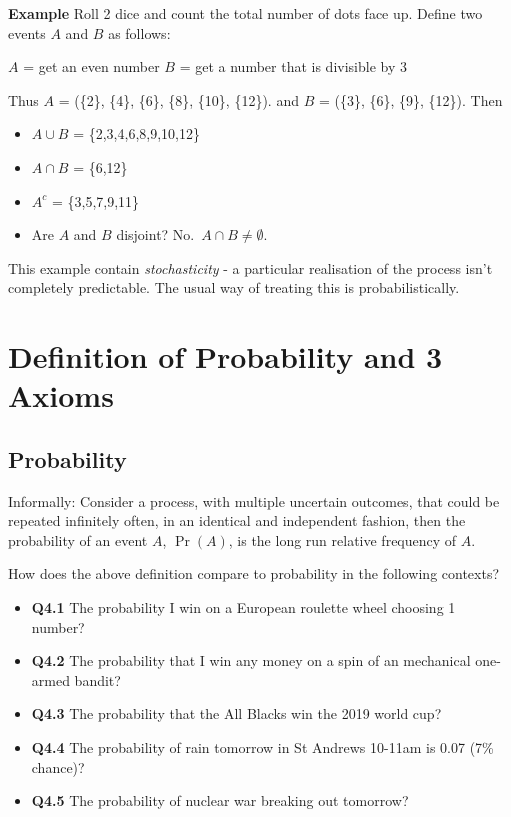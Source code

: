 \documentclass[
  oneside]{krantz}
\providecommand{\tightlist}{%
  \setlength{\itemsep}{0pt}\setlength{\parskip}{0pt}}
\begin{document}
\textbf{Example} Roll 2 dice and count the total number of dots face up. Define two events \(A\) and \(B\) as follows:

\(A\) = get an even number
\(B\) = get a number that is divisible by 3

Thus \(A\) = (\{2\}, \{4\}, \{6\}, \{8\}, \{10\}, \{12\}). and \(B\) = (\{3\}, \{6\}, \{9\}, \{12\}). Then

\begin{itemize}
\tightlist
\item
  \(A \cup B\) = \{2,3,4,6,8,9,10,12\}
\item
  \(A \cap B\) = \{6,12\}
\item
  \(A^c\) = \{3,5,7,9,11\}
\item
  Are \(A\) and \(B\) disjoint? No.~\(A \cap B \ne \emptyset\).
\end{itemize}

This example contain \emph{stochasticity} - a particular realisation of the process isn't completely predictable. The usual way of treating this is probabilistically.

\hypertarget{definition-of-probability-and-3-axioms}{%
\section{Definition of Probability and 3 Axioms}\label{definition-of-probability-and-3-axioms}}

\hypertarget{probability-1}{%
\subsection{Probability}\label{probability-1}}

Informally: Consider a process, with multiple uncertain outcomes, that could be repeated infinitely often, in an identical and independent fashion, then the probability of an event \(A\), \(\Pr(A)\), is the long run relative frequency of \(A\).

How does the above definition compare to probability in the following contexts?

\begin{itemize}
\tightlist
\item
  \textbf{Q4.1} The probability I win on a European roulette wheel choosing 1 number?
\item
  \textbf{Q4.2} The probability that I win any money on a spin of an mechanical one-armed bandit?
\item
  \textbf{Q4.3} The probability that the All Blacks win the 2019 world cup?
\item
  \textbf{Q4.4} The probability of rain tomorrow in St Andrews 10-11am is 0.07 (7\% chance)?
\item
  \textbf{Q4.5} The probability of nuclear war breaking out tomorrow?
\end{itemize}
\end{document}
